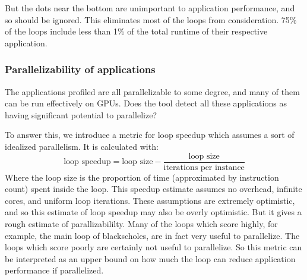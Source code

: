 \documentclass[12pt,twoside]{reedthesis}
\begin{document}
		But the dots near the bottom are unimportant to application performance, and so should be ignored. This eliminates most of the loops from consideration. 75\% of the loops include less than 1\% of the total runtime of their respective application. 
		
		
		
		\subsubsection{Parallelizability of applications}
		
		The applications profiled are all parallelizable to some degree, and many of them can be run effectively on GPUs. Does the tool detect all these applications as having significant potential to parallelize? 
		
		To answer this, we introduce a metric for loop speedup which assumes a sort of idealized parallelism. It is calculated with:
		$$\text{loop speedup} = \text{loop size} - \frac{\text{loop size}}{\text{iterations per instance}} $$
		Where the loop size is the proportion of time (approximated by instruction count) spent inside the loop.
		This speedup estimate assumes no overhead, infinite cores, and uniform loop iterations.
		These assumptions are extremely optimistic, and so this estimate of loop speedup may also be overly optimistic. But it gives a rough estimate of parallizabililty. Many of the loops which score highly, for example, the main loop of blackscholes, are in fact very useful to parallelize. The loops which score poorly are certainly not useful to parallelize. 
		So this metric can be interpreted as an upper bound on how much the loop can reduce application performance if parallelized. 
		
\end{document}
